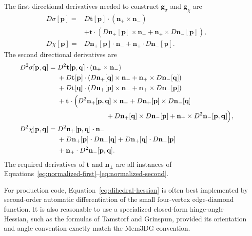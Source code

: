 \documentclass[11pt]{article}
\begin{document}
The first directional derivatives needed to construct $\mathbf{g}_{\sigma}$ and $\mathbf{g}_{\chi}$ are
\begin{align}
  D\sigma[\mathbf{p}]
  ={}&D\mathbf{t}[\mathbf{p}]\cdot(\mathbf{n}_+\times\mathbf{n}_-)
  \\
  &+\mathbf{t}\cdot\left(
      D\mathbf{n}_+[\mathbf{p}]\times\mathbf{n}_-
      +\mathbf{n}_+\times D\mathbf{n}_-[\mathbf{p}]
    \right),
  \label{eq:sigma-first}\\
  D\chi[\mathbf{p}]
  ={}&D\mathbf{n}_+[\mathbf{p}]\cdot\mathbf{n}_-
      +\mathbf{n}_+\cdot D\mathbf{n}_-[\mathbf{p}].
  \label{eq:chi-first}
\end{align}
The second directional derivatives are
\begin{align}
  D^2\sigma[\mathbf{p},\mathbf{q}]
  ={}&D^2\mathbf{t}[\mathbf{p},\mathbf{q}]
       \cdot(\mathbf{n}_+\times\mathbf{n}_-)
  \\
  &+D\mathbf{t}[\mathbf{p}]\cdot\left(
       D\mathbf{n}_+[\mathbf{q}]\times\mathbf{n}_-
       +\mathbf{n}_+\times D\mathbf{n}_-[\mathbf{q}]
     \right)
  \\
  &+D\mathbf{t}[\mathbf{q}]\cdot\left(
       D\mathbf{n}_+[\mathbf{p}]\times\mathbf{n}_-
       +\mathbf{n}_+\times D\mathbf{n}_-[\mathbf{p}]
     \right)
  \\
  &+\mathbf{t}\cdot\Bigl(
       D^2\mathbf{n}_+[\mathbf{p},\mathbf{q}]\times\mathbf{n}_-
       +D\mathbf{n}_+[\mathbf{p}]\times D\mathbf{n}_-[\mathbf{q}]
  \\
  &\hspace{25mm}
       +D\mathbf{n}_+[\mathbf{q}]\times D\mathbf{n}_-[\mathbf{p}]
       +\mathbf{n}_+\times D^2\mathbf{n}_-[\mathbf{p},\mathbf{q}]
     \Bigr),
  \label{eq:sigma-second}\\
  D^2\chi[\mathbf{p},\mathbf{q}]
  ={}&D^2\mathbf{n}_+[\mathbf{p},\mathbf{q}]\cdot\mathbf{n}_-
  \\
  &+D\mathbf{n}_+[\mathbf{p}]\cdot D\mathbf{n}_-[\mathbf{q}]
   +D\mathbf{n}_+[\mathbf{q}]\cdot D\mathbf{n}_-[\mathbf{p}]
  \\
  &+\mathbf{n}_+\cdot D^2\mathbf{n}_-[\mathbf{p},\mathbf{q}].
  \label{eq:chi-second}
\end{align}
The required derivatives of $\mathbf{t}$ and $\mathbf{n}_{\pm}$ are all instances of Equations~\eqref{eq:normalized-first}--\eqref{eq:normalized-second}.

For production code, Equation~\eqref{eq:dihedral-hessian} is often best implemented by second-order automatic differentiation of the small four-vertex edge-diamond function.  It is also reasonable to use a specialized closed-form hinge-angle Hessian, such as the formulas of Tamstorf and Grinspun, provided its orientation and angle convention exactly match the Mem3DG convention.
\end{document}
